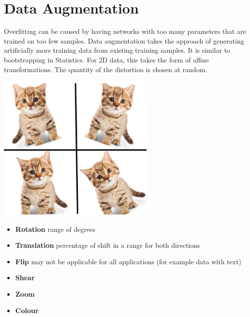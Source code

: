 \documentclass[11pt]{article}
\begin{document}
\section{Data Augmentation}
\label{sec:DataAugmentation}
\begin{minipage}{0.6\linewidth}
	Overfitting can be caused by having networks with too many parameters that are trained on too few samples. Data augmentation takes the approach of generating artificially more training data from existing training samples. It is similar to bootstrapping in Statistics. For 2D data, this takes the form of affine transformations. The quantity of the distortion is chosen at random.
\end{minipage}
\hspace{1cm}
\begin{minipage}{0.2\linewidth}
	\centering
	\includegraphics[width=\linewidth]{img/data_augmentation_cat_example}
\end{minipage}

\begin{itemize}
	\item \textbf{Rotation} range of degrees
	\item \textbf{Translation} percentage of shift in a range for both directions
	\item \textbf{Flip} may not be applicable for all applications (for example data with text)
	\item \textbf{Shear}
	\item \textbf{Zoom}
	\item \textbf{Colour}
\end{itemize}
\end{document}
